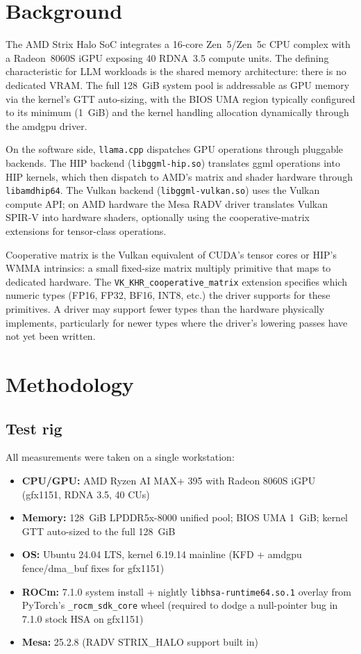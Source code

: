 \documentclass[10pt,a4paper]{article}
\begin{document}
\section{Background}

The AMD Strix Halo SoC integrates a 16-core Zen~5/Zen~5c CPU complex with a Radeon~8060S iGPU exposing 40 RDNA~3.5 compute units. The defining characteristic for LLM workloads is the shared memory architecture: there is no dedicated VRAM. The full 128~GiB system pool is addressable as GPU memory via the kernel's GTT auto-sizing, with the BIOS UMA region typically configured to its minimum (1~GiB) and the kernel handling allocation dynamically through the amdgpu driver.

On the software side, \texttt{llama.cpp} dispatches GPU operations through pluggable backends. The HIP backend (\texttt{libggml-hip.so}) translates ggml operations into HIP kernels, which then dispatch to AMD's matrix and shader hardware through \texttt{libamdhip64}. The Vulkan backend (\texttt{libggml-vulkan.so}) uses the Vulkan compute API; on AMD hardware the Mesa RADV driver translates Vulkan SPIR-V into hardware shaders, optionally using the cooperative-matrix extensions for tensor-class operations.

Cooperative matrix is the Vulkan equivalent of CUDA's tensor cores or HIP's WMMA intrinsics: a small fixed-size matrix multiply primitive that maps to dedicated hardware. The \texttt{VK\_KHR\_cooperative\_matrix} extension specifies which numeric types (FP16, FP32, BF16, INT8, etc.) the driver supports for these primitives. A driver may support fewer types than the hardware physically implements, particularly for newer types where the driver's lowering passes have not yet been written.

\section{Methodology}\label{sec:methodology}

\subsection{Test rig}

All measurements were taken on a single workstation:

\begin{itemize}
  \item \textbf{CPU/GPU:} AMD Ryzen AI MAX+ 395 with Radeon 8060S iGPU (gfx1151, RDNA 3.5, 40 CUs)
  \item \textbf{Memory:} 128~GiB LPDDR5x-8000 unified pool; BIOS UMA 1~GiB; kernel GTT auto-sized to the full 128~GiB
  \item \textbf{OS:} Ubuntu 24.04 LTS, kernel 6.19.14 mainline (KFD + amdgpu fence/dma\_buf fixes for gfx1151)
  \item \textbf{ROCm:} 7.1.0 system install + nightly \texttt{libhsa-runtime64.so.1} overlay from PyTorch's \texttt{\_rocm\_sdk\_core} wheel (required to dodge a null-pointer bug in 7.1.0 stock HSA on gfx1151)
  \item \textbf{Mesa:} 25.2.8 (RADV STRIX\_HALO support built in)
\end{itemize}
\end{document}

